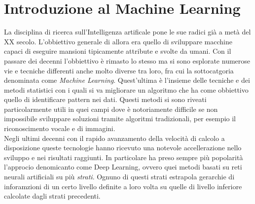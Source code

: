 \documentclass[12pt,a4paper,openright,twoside]{report}
\begin{document}
\chapter{Introduzione al Machine Learning}                %
\lhead[\fancyplain{}{\bfseries\thepage}]{\fancyplain{}{\bfseries\rightmark}}
La disciplina di ricerca sull'Intelligenza artificale pone le sue radici già a metà del XX secolo. L'obbiettivo generale di allora era quello di sviluppare macchine capaci di eseguire mansioni tipicamente attribute e svolte da umani. 
Con il passare dei decenni l'obbiettivo è rimasto lo stesso ma si sono esplorate numerose vie e tecniche differenti anche molto diverse tra loro, fra cui la sottocatgoria denominata come \emph{Machine Learning}. Quest'ultima è l'insieme delle tecniche e dei metodi statistici con i quali si va migliorare un algoritmo che ha come obbiettivo quello di identificare pattern nei dati. 
Questi metodi si sono riveati particolarmente utili in quei campi dove è notoriamente difficile se non impossibile sviluppare soluzioni tramite algoritmi tradizionali, per esempio il riconoscimento vocale e di immagini.\\
Negli ultimi decenni con il rapido avanzamento della velocità di calcolo a disposizione queste tecnologie hanno ricevuto una notevole accellerazione nello sviluppo e nei risultati raggiunti. 
In particolare ha preso sempre più popolarità l'approcio denomicanto come Deep Learning, ovvero quei metodi basati su reti neurali artificiali su più \emph{strati}. Ognuno di questi strati estrapola gerarchie di inforamzioni di un certo livello definite a loro volta su quelle di livello inferiore calcolate dagli strati precedenti.
\end{document}
